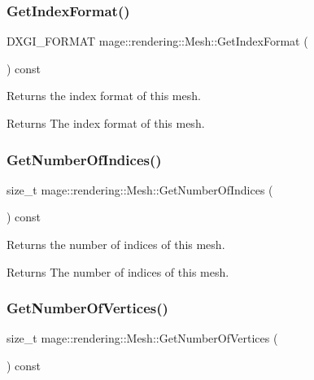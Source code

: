 \subsubsection{\texorpdfstring{Get\+Index\+Format()}{GetIndexFormat()}}
{\footnotesize\ttfamily D\+X\+G\+I\+\_\+\+F\+O\+R\+M\+AT mage\+::rendering\+::\+Mesh\+::\+Get\+Index\+Format (\begin{DoxyParamCaption}{ }\end{DoxyParamCaption}) const\hspace{0.3cm}{\ttfamily [noexcept]}}

Returns the index format of this mesh.

\begin{DoxyReturn}{Returns}
The index format of this mesh. 
\end{DoxyReturn}
\mbox{\label{classmage_1_1rendering_1_1_mesh_aaf8574345279790ca88d8acc5c2c85b6}} 
\subsubsection{\texorpdfstring{Get\+Number\+Of\+Indices()}{GetNumberOfIndices()}}
{\footnotesize\ttfamily size\+\_\+t mage\+::rendering\+::\+Mesh\+::\+Get\+Number\+Of\+Indices (\begin{DoxyParamCaption}{ }\end{DoxyParamCaption}) const\hspace{0.3cm}{\ttfamily [noexcept]}}

Returns the number of indices of this mesh.

\begin{DoxyReturn}{Returns}
The number of indices of this mesh. 
\end{DoxyReturn}
\mbox{\label{classmage_1_1rendering_1_1_mesh_a2c594e3c3b8e09bc20b35845ab46b6f3}} 
\subsubsection{\texorpdfstring{Get\+Number\+Of\+Vertices()}{GetNumberOfVertices()}}
{\footnotesize\ttfamily size\+\_\+t mage\+::rendering\+::\+Mesh\+::\+Get\+Number\+Of\+Vertices (\begin{DoxyParamCaption}{ }\end{DoxyParamCaption}) const\hspace{0.3cm}{\ttfamily [noexcept]}}

